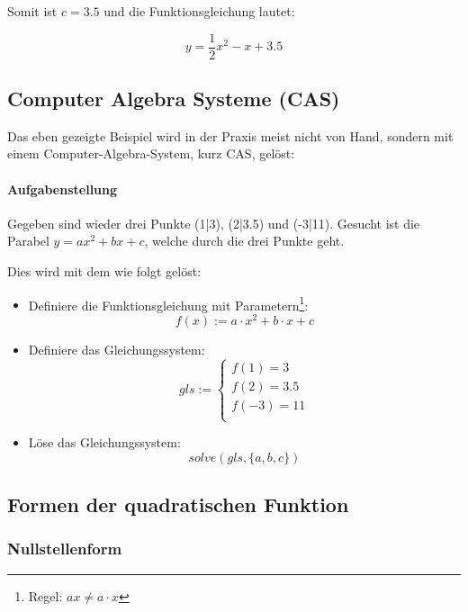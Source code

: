Somit ist $c=3.5$ und die Funktionsgleichung lautet:

$$y = \frac{1}{2}x^2 - x + 3.5$$


\newpage


\subsection{Computer Algebra Systeme (CAS)}
Das eben gezeigte Beispiel wird in der Praxis meist nicht von Hand,
sondern mit einem Computer-Algebra-System, kurz CAS, gelöst:

\paragraph{Aufgabenstellung}
Gegeben sind wieder drei Punkte (1|3), (2|3.5) und (-3|11).
Gesucht ist die Parabel $y = ax^2 + bx + c$, welche durch die drei
Punkte geht.

Dies wird mit dem \tinspire{} wie folgt gelöst:
\begin{itemize}
\item Definiere die Funktionsgleichung mit
  Parametern\footnote{\tinspire Regel: $ax\ne a\cdot{} x$}:\\
  $$f(x) := a\cdot{}x^2 + b\cdot{}x + c$$
\item Definiere das Gleichungssystem:
  $$gls := \left\{ \begin{array}{l}
    f(1) = 3\\
    f(2) = 3.5\\
    f(-3)= 11\\
  \end{array}\right.$$
\item Löse das Gleichungssystem:
  $$solve(gls,\{a, b, c\})$$
\end{itemize}

\newpage

\subsection{Formen der quadratischen Funktion}
\subsubsection{Nullstellenform}

